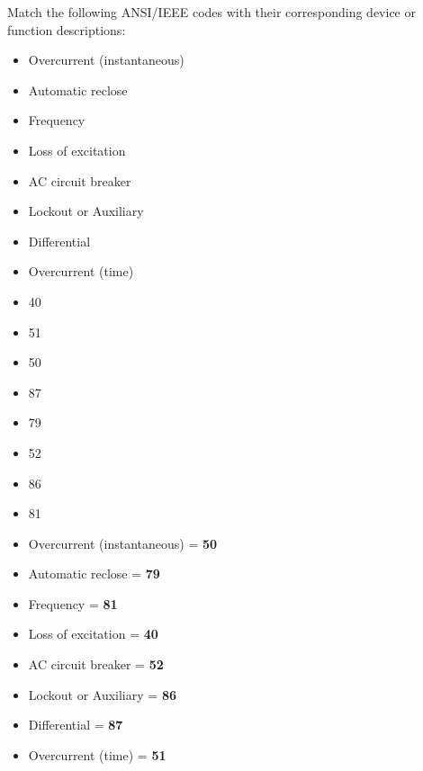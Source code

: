 

Match the following ANSI/IEEE codes with their corresponding device or function descriptions:

\vskip 10pt

\begin{itemize}
\item{} Overcurrent (instantaneous)
\item{} Automatic reclose
\item{} Frequency
\item{} Loss of excitation
\item{} AC circuit breaker
\item{} Lockout or Auxiliary
\item{} Differential
\item{} Overcurrent (time)
\end{itemize}

\vskip 10pt

\begin{itemize}
\item{} 40
\item{} 51
\item{} 50
\item{} 87
\item{} 79
\item{} 52
\item{} 86
\item{} 81
\end{itemize}

\vskip 10pt







 






\begin{itemize}
\item{} Overcurrent (instantaneous) = {\bf 50}
\item{} Automatic reclose = {\bf 79}
\item{} Frequency = {\bf 81}
\item{} Loss of excitation = {\bf 40}
\item{} AC circuit breaker = {\bf 52}
\item{} Lockout or Auxiliary = {\bf 86}
\item{} Differential = {\bf 87}
\item{} Overcurrent (time) = {\bf 51}
\end{itemize}





